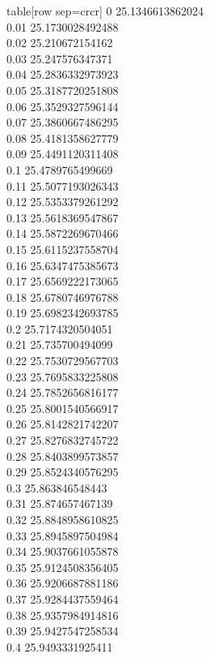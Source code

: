   table[row sep=crcr]{%
0	25.1346613862024\\
0.01	25.1730028492488\\
0.02	25.210672154162\\
0.03	25.247576347371\\
0.04	25.2836332973923\\
0.05	25.3187720251808\\
0.06	25.3529327596144\\
0.07	25.3860667486295\\
0.08	25.4181358627779\\
0.09	25.4491120311408\\
0.1	25.4789765499669\\
0.11	25.5077193026343\\
0.12	25.5353379261292\\
0.13	25.5618369547867\\
0.14	25.5872269670466\\
0.15	25.6115237558704\\
0.16	25.6347475385673\\
0.17	25.6569222173065\\
0.18	25.6780746976788\\
0.19	25.6982342693785\\
0.2	25.7174320504051\\
0.21	25.735700494099\\
0.22	25.7530729567703\\
0.23	25.7695833225808\\
0.24	25.7852656816177\\
0.25	25.8001540566917\\
0.26	25.8142821742207\\
0.27	25.8276832745722\\
0.28	25.8403899573857\\
0.29	25.8524340576295\\
0.3	25.863846548443\\
0.31	25.874657467139\\
0.32	25.8848958610825\\
0.33	25.8945897504984\\
0.34	25.9037661055878\\
0.35	25.9124508356405\\
0.36	25.9206687881186\\
0.37	25.9284437559464\\
0.38	25.9357984914816\\
0.39	25.9427547258534\\
0.4	25.9493331925411\\
}
